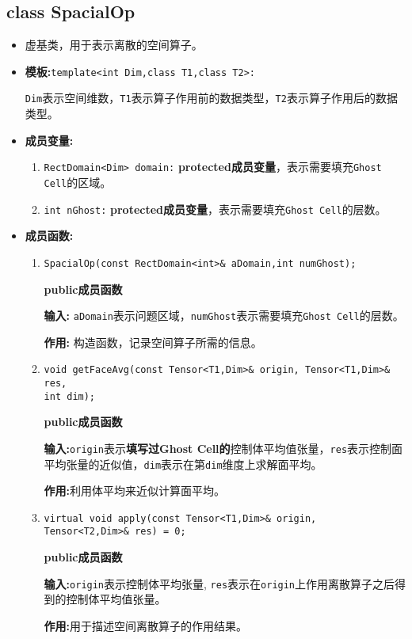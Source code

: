 \documentclass[UTF8]{ctexart}
\theoremstyle{plain}
\theoremstyle{definition}
\theoremstyle{remark}
\begin{document}
\subsection{class SpacialOp}
\begin{itemize}
    \item 虚基类，用于表示离散的空间算子。
    \item \textbf{模板:}\texttt{template<int Dim,class T1,class T2>:}
    
    \texttt{Dim}表示空间维数，\texttt{T1}表示算子作用前的数据类型，\texttt{T2}表示算子作用后的数据类型。

    \item \textbf{成员变量:}
    \begin{enumerate}
        \item \texttt{RectDomain<Dim> domain:} \textbf{protected成员变量}，表示需要填充\texttt{Ghost Cell}的区域。
        \item \texttt{int nGhost:} \textbf{protected成员变量}，表示需要填充\texttt{Ghost Cell}的层数。
    \end{enumerate}

    \item \textbf{成员函数:}
    \begin{enumerate}
        \item \texttt{SpacialOp(const RectDomain<int>\& aDomain,int numGhost);}
        
        \textbf{public成员函数}

        \textbf{输入:} \texttt{aDomain}表示问题区域，\texttt{numGhost}表示需要填充\texttt{Ghost Cell}的层数。

        \textbf{作用:} 构造函数，记录空间算子所需的信息。

        \item \texttt{void getFaceAvg(const Tensor<T1,Dim>\& origin, Tensor<T1,Dim>\& res,\\ int dim);}
        
        \textbf{public成员函数}

        \textbf{输入:}\texttt{origin}表示\textbf{填写过Ghost Cell的}控制体平均值张量，\texttt{res}表示控制面平均张量的近似值，\texttt{dim}表示在第\texttt{dim}维度上求解面平均。

        \textbf{作用:}利用体平均来近似计算面平均。

        \item \texttt{virtual void apply(const Tensor<T1,Dim>\& origin, Tensor<T2,Dim>\& res) = 0;}
        
        \textbf{public成员函数}

        \textbf{输入:}\texttt{origin}表示控制体平均张量, \texttt{res}表示在\texttt{origin}上作用离散算子之后得到的控制体平均值张量。

        \textbf{作用:}用于描述空间离散算子的作用结果。
    \end{enumerate}
\end{itemize}
\end{document}
